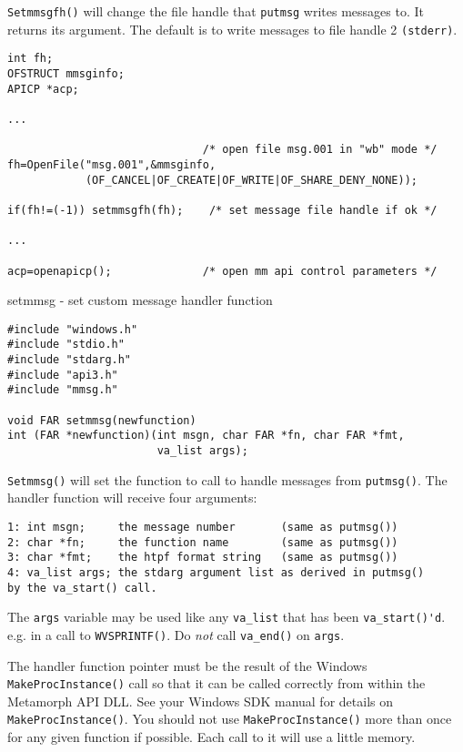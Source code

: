 \DESCRIPTION

\verb`Setmmsgfh()` will change the file handle that \verb`putmsg` writes
messages to.  It returns its argument.  The default is to write
messages to file handle 2 \verb`(stderr)`.

\EXAMPLE
\begin{verbatim}
int fh;
OFSTRUCT mmsginfo;
APICP *acp;

...

                              /* open file msg.001 in "wb" mode */
fh=OpenFile("msg.001",&mmsginfo,
            (OF_CANCEL|OF_CREATE|OF_WRITE|OF_SHARE_DENY_NONE));

if(fh!=(-1)) setmmsgfh(fh);    /* set message file handle if ok */

...

acp=openapicp();              /* open mm api control parameters */

\end{verbatim}


\NAME
{setmmsg - set custom message handler function}

\SYNOPSIS
\begin{verbatim}
#include "windows.h"
#include "stdio.h"
#include "stdarg.h"
#include "api3.h"
#include "mmsg.h"

void FAR setmmsg(newfunction)
int (FAR *newfunction)(int msgn, char FAR *fn, char FAR *fmt,
                       va_list args);

\end{verbatim}

\DESCRIPTION

\verb`Setmmsg()` will set the function to call to handle messages from
\verb`putmsg()`.  The handler function will receive four arguments:

\begin{verbatim}
1: int msgn;     the message number       (same as putmsg())
2: char *fn;     the function name        (same as putmsg())
3: char *fmt;    the htpf format string   (same as putmsg())
4: va_list args; the stdarg argument list as derived in putmsg()
by the va_start() call.
\end{verbatim}

The \verb`args` variable may be used like any \verb`va_list` that has been
\verb`va_start()'d`. e.g. in a call to \verb`WVSPRINTF()`.  Do {\em not} call \verb`va_end()`
on \verb`args`.

The handler function pointer must be the result of the Windows
\verb`MakeProcInstance()` call so that it can be called correctly from
within the Metamorph API DLL.  See your Windows SDK manual for
details on \verb`MakeProcInstance()`.  You should not use
\verb`MakeProcInstance()` more than once for any given function if
possible.  Each call to it will use a little memory.

